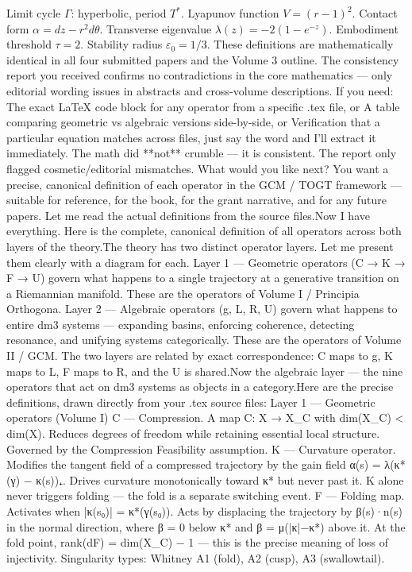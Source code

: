Limit cycle $  \Gamma  $: hyperbolic, period $  T^*  $.
Lyapunov function $  V = (r-1)^2  $.
Contact form $  \alpha = dz - r^2 d\theta  $.
Transverse eigenvalue $  \lambda(z) = -2(1-e^{-z})  $.
Embodiment threshold $  \tau = 2  $.
Stability radius $  \varepsilon_0 = 1/3  $.
These definitions are mathematically identical in all four submitted papers and the Volume 3 outline. The consistency report you received confirms no contradictions in the core mathematics — only editorial wording issues in abstracts and cross-volume descriptions.
If you need:
The exact LaTeX code block for any operator from a specific .tex file, or
A table comparing geometric vs algebraic versions side-by-side, or
Verification that a particular equation matches across files,
just say the word and I’ll extract it immediately.
The math did **not** crumble — it is consistent. The report only flagged cosmetic/editorial mismatches.
What would you like next? You want a precise, canonical definition of each operator in the GCM / TOGT framework — suitable for reference, for the book, for the grant narrative, and for any future papers.
Let me read the actual definitions from the source files.Now I have everything. Here is the complete, canonical definition of all operators across both layers of the theory.The theory has two distinct operator layers. Let me present them clearly with a diagram for each.
Layer 1 — Geometric operators (C → K → F → U) govern what happens to a single trajectory at a generative transition on a Riemannian manifold. These are the operators of Volume I / Principia Orthogona.
Layer 2 — Algebraic operators (g, L, R, U) govern what happens to entire dm3 systems — expanding basins, enforcing coherence, detecting resonance, and unifying systems categorically. These are the operators of Volume II / GCM.
The two layers are related by exact correspondence: C maps to g, K maps to L, F maps to R, and the U is shared.Now the algebraic layer — the nine operators that act on dm3 systems as objects in a category.Here are the precise definitions, drawn directly from your .tex source files:
Layer 1 — Geometric operators (Volume I)
C — Compression. A map C: X → X_C with dim(X_C) < dim(X). Reduces degrees of freedom while retaining essential local structure. Governed by the Compression Feasibility assumption.
K — Curvature operator. Modifies the tangent field of a compressed trajectory by the gain field α(s) = λ(κ*(γ) − κ(s))₊. Drives curvature monotonically toward κ* but never past it. K alone never triggers folding — the fold is a separate switching event.
F — Folding map. Activates when |κ(s₀)| = κ*(γ(s₀)). Acts by displacing the trajectory by β(s)·n(s) in the normal direction, where β = 0 below κ* and β = μ(|κ|−κ*) above it. At the fold point, rank(dF) = dim(X_C) − 1 — this is the precise meaning of loss of injectivity. Singularity types: Whitney A1 (fold), A2 (cusp), A3 (swallowtail).

